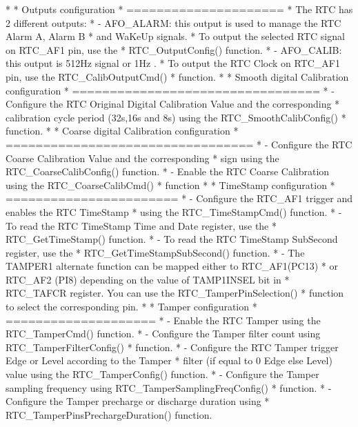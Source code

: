 \begin{DoxyVerb}
*
*          Outputs configuration
*          =====================
*          The RTC has 2 different outputs:
*            - AFO_ALARM: this output is used to manage the RTC Alarm A, Alarm B
*              and WaKeUp signals.          
*              To output the selected RTC signal on RTC_AF1 pin, use the 
*              RTC_OutputConfig() function.                
*            - AFO_CALIB: this output is 512Hz signal or 1Hz .  
*              To output the RTC Clock on RTC_AF1 pin, use the RTC_CalibOutputCmd()
*              function.
*
*          Smooth digital Calibration configuration
*          =================================    
*            - Configure the RTC Original Digital Calibration Value and the corresponding
*              calibration cycle period (32s,16s and 8s) using the RTC_SmoothCalibConfig() 
*              function.
*
*          Coarse digital Calibration configuration
*          =================================
*            - Configure the RTC Coarse Calibration Value and the corresponding
*              sign using the RTC_CoarseCalibConfig() function.
*            - Enable the RTC Coarse Calibration using the RTC_CoarseCalibCmd() 
*              function  
*
*          TimeStamp configuration
*          =======================
*            - Configure the RTC_AF1 trigger and enables the RTC TimeStamp 
*              using the RTC_TimeStampCmd() function.
*            - To read the RTC TimeStamp Time and Date register, use the 
*              RTC_GetTimeStamp() function.
*            - To read the RTC TimeStamp SubSecond register, use the 
*              RTC_GetTimeStampSubSecond() function.
*            - The TAMPER1 alternate function can be mapped either to RTC_AF1(PC13)
*              or RTC_AF2 (PI8) depending on the value of TAMP1INSEL bit in 
*              RTC_TAFCR register. You can use the  RTC_TamperPinSelection()
*              function to select the corresponding pin.     
*
*          Tamper configuration
*          ====================
*            - Enable the RTC Tamper using the RTC_TamperCmd() function.
*             - Configure the Tamper filter count using RTC_TamperFilterConfig()
*              function. 
*            - Configure the RTC Tamper trigger Edge or Level according to the Tamper 
*              filter (if equal to 0 Edge else Level) value using the RTC_TamperConfig() function.
*            - Configure the Tamper sampling frequency using RTC_TamperSamplingFreqConfig()
*              function.
*            - Configure the Tamper precharge or discharge duration using 
*              RTC_TamperPinsPrechargeDuration() function.

\end{DoxyVerb}
